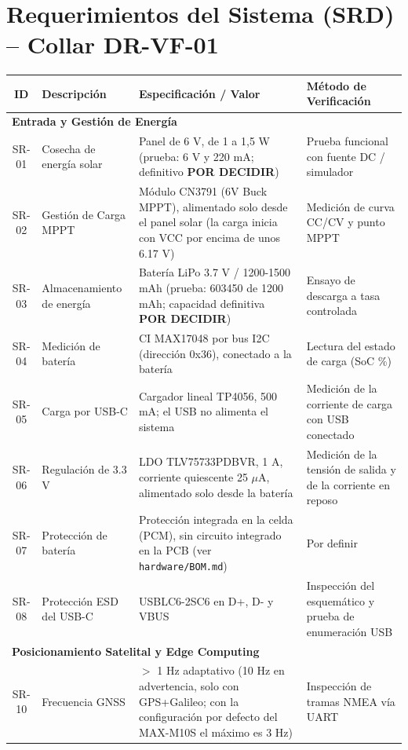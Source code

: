 \section*{Requerimientos del Sistema (SRD) -- Collar DR-VF-01}

\begin{table}[H]
\centering
\small
\begin{tabularx}{\textwidth}{|c X X X|}
\hline
\rowcolor{categorybg}
\textbf{ID} & \textbf{Descripción} & \textbf{Especificación / Valor} & \textbf{Método de Verificación} \\ \hline
\multicolumn{4}{|l|}{\cellcolor{categorybgsub}\textbf{Entrada y Gestión de Energía}} \\ \hline
SR-01 & Cosecha de energía solar & Panel de 6 V, de 1 a 1,5 W (prueba: 6 V y 220 mA; definitivo \textbf{POR DECIDIR}) & Prueba funcional con fuente DC / simulador \\ \hline
SR-02 & Gestión de Carga MPPT & Módulo CN3791 (6V Buck MPPT), alimentado solo desde el panel solar (la carga inicia con VCC por encima de unos 6.17 V) & Medición de curva CC/CV y punto MPPT \\ \hline
SR-03 & Almacenamiento de energía & Batería LiPo 3.7 V / 1200-1500 mAh (prueba: 603450 de 1200 mAh; capacidad definitiva \textbf{POR DECIDIR}) & Ensayo de descarga a tasa controlada \\ \hline
SR-04 & Medición de batería & CI MAX17048 por bus I2C (dirección 0x36), conectado a la batería & Lectura del estado de carga (SoC \%) \\ \hline
SR-05 & Carga por USB-C & Cargador lineal TP4056, 500 mA; el USB no alimenta el sistema & Medición de la corriente de carga con USB conectado \\ \hline
SR-06 & Regulación de 3.3 V & LDO TLV75733PDBVR, 1 A, corriente quiescente 25 $\mu$A, alimentado solo desde la batería & Medición de la tensión de salida y de la corriente en reposo \\ \hline
SR-07 & Protección de batería & Protección integrada en la celda (PCM), sin circuito integrado en la PCB (ver \texttt{hardware/BOM.md}) & Por definir \\ \hline
SR-08 & Protección ESD del USB-C & USBLC6-2SC6 en D+, D- y VBUS & Inspección del esquemático y prueba de enumeración USB \\ \hline
\multicolumn{4}{|l|}{\cellcolor{categorybgsub}\textbf{Posicionamiento Satelital y Edge Computing}} \\ \hline
SR-10 & Frecuencia GNSS & $>$ 1 Hz adaptativo (10 Hz en advertencia, solo con GPS+Galileo; con la configuración por defecto del MAX-M10S el máximo es 3 Hz) & Inspección de tramas NMEA vía UART \\ \hline

\end{tabularx}
\end{table}
